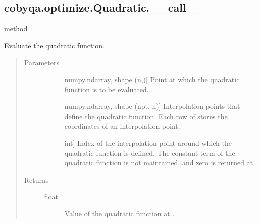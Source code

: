 \documentclass[letterpaper,10pt,english]{sphinxmanual}
\begin{document}
\begin{fulllineitems}
\subsection{cobyqa.optimize.Quadratic.\_\_call\_\_}
\label{\detokenize{refs/generated/cobyqa.optimize.Quadratic.__call__:cobyqa-optimize-quadratic-call}}\label{\detokenize{refs/generated/cobyqa.optimize.Quadratic.__call__::doc}}
\sphinxAtStartPar
method

\begin{fulllineitems}
\label{\detokenize{refs/generated/cobyqa.optimize.Quadratic.__call__:cobyqa.optimize.Quadratic.__call__}}
\sphinxAtStartPar
Evaluate the quadratic function.
\begin{quote}\begin{description}
\item[{Parameters}] \leavevmode\begin{description}
\item[{}] \leavevmode{[}numpy.ndarray, shape (n,){]}
\sphinxAtStartPar
Point at which the quadratic function is to be evaluated.

\item[{}] \leavevmode{[}numpy.ndarray, shape (npt, n){]}
\sphinxAtStartPar
Interpolation points that define the quadratic function. Each row of
 stores the coordinates of an interpolation point.

\item[{}] \leavevmode{[}int{]}
\sphinxAtStartPar
Index of the interpolation point around which the quadratic function
is defined. The constant term of the quadratic function is not
maintained, and zero is returned at .

\end{description}

\item[{Returns}] \leavevmode\begin{description}
\item[{float}] \leavevmode
\sphinxAtStartPar
Value of the quadratic function at .

\end{description}


\end{description}
\end{quote}
\end{fulllineitems}
\end{fulllineitems}
\end{document}
